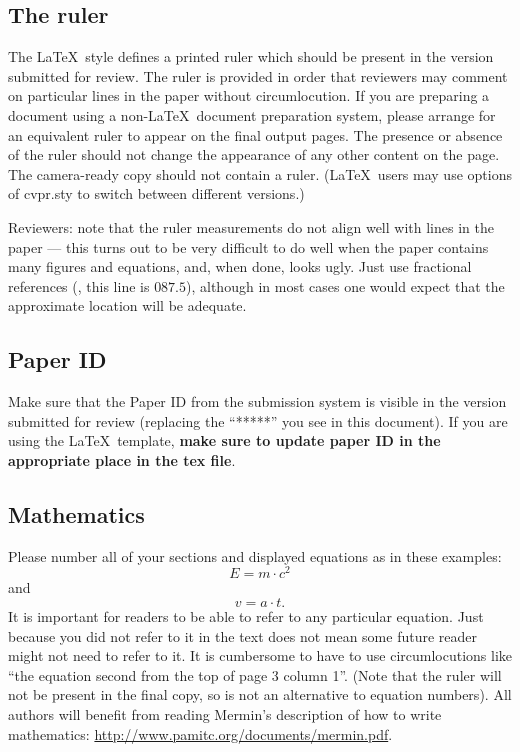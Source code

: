 \documentclass[10pt,twocolumn,letterpaper]{article}
\begin{document}
\subsection{The ruler}
The \LaTeX\ style defines a printed ruler which should be present in the version submitted for review.
The ruler is provided in order that reviewers may comment on particular lines in the paper without circumlocution.
If you are preparing a document using a non-\LaTeX\ document preparation system, please arrange for an equivalent ruler to appear on the final output pages.
The presence or absence of the ruler should not change the appearance of any other content on the page.
The camera-ready copy should not contain a ruler.
(\LaTeX\ users may use options of cvpr.sty to switch between different versions.)

Reviewers:
note that the ruler measurements do not align well with lines in the paper --- this turns out to be very difficult to do well when the paper contains many figures and equations, and, when done, looks ugly.
Just use fractional references (\eg, this line is $087.5$), although in most cases one would expect that the approximate location will be adequate.


\subsection{Paper ID}
Make sure that the Paper ID from the submission system is visible in the version submitted for review (replacing the ``*****'' you see in this document).
If you are using the \LaTeX\ template, \textbf{make sure to update paper ID in the appropriate place in the tex file}.


\subsection{Mathematics}

Please number all of your sections and displayed equations as in these examples:
\begin{equation}
  E = m\cdot c^2
  \label{eq:important}
\end{equation}
and
\begin{equation}
  v = a\cdot t.
  \label{eq:also-important}
\end{equation}
It is important for readers to be able to refer to any particular equation.
Just because you did not refer to it in the text does not mean some future reader might not need to refer to it.
It is cumbersome to have to use circumlocutions like ``the equation second from the top of page 3 column 1''.
(Note that the ruler will not be present in the final copy, so is not an alternative to equation numbers).
All authors will benefit from reading Mermin's description of how to write mathematics:
\url{http://www.pamitc.org/documents/mermin.pdf}.
\end{document}
